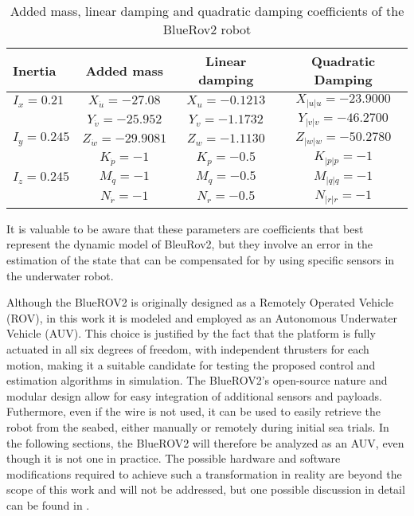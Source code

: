 \begin{table}[H]
    \centering
    \begin{tabular}{l c c c} \toprule
        {Inertia} & {Added mass} & {Linear damping} & {Quadratic Damping} \\ \midrule
        $I_x = 0.21$ & $X_{\dot{u}} = -27.08$ & $X_u = -0.1213$  & $X_{|u|u} = -23.9000$ \\
        { } & $Y_{\dot{v}} = -25.952$ & $Y_v = -1.1732$  & $Y_{|v|v} = -46.2700$ \\
        $I_y = 0.245$ & $Z_{\dot{w}} = -29.9081$ & $Z_w = -1.1130$  & $Z_{|w|w} = -50.2780$ \\
        { } & $K_{\dot{p}} = -1$ & $K_p = -0.5$  & $K_{|p|p} = -1$ \\
        $I_z = 0.245$ & $M_{\dot{q}} = -1$ & $M_q = -0.5$  & $M_{|q|q} = -1$ \\
        { } & $N_{\dot{r}} = -1$ & $N_r = -0.5$  & $N_{|r|r} = -1$ \\ \bottomrule
    \end{tabular}
    \caption{Added mass, linear damping and quadratic damping coefficients of the BlueRov2 robot}
    \label{tab:BlueRov_param}
\end{table}

It is valuable to be aware that these parameters are coefficients that best represent the dynamic model of BleuRov2, but they involve an error in the estimation of the 
state that can be compensated for by using specific sensors in the underwater robot.

Although the BlueROV2 is originally designed as a Remotely Operated Vehicle (ROV), in this work it is modeled and employed as an Autonomous Underwater Vehicle (AUV). 
This choice is justified by the fact that the platform is fully actuated in all six degrees of freedom, with independent thrusters for each motion, making it a 
suitable candidate for testing the proposed control and estimation algorithms in simulation. The BlueROV2's open-source nature and modular design allow 
for easy integration of additional sensors and payloads. Futhermore, even if the wire is not used, it can be used to easily retrieve the robot from the seabed, 
either manually or remotely during initial sea trials.
In the following sections, the BlueROV2 will therefore be analyzed as an AUV, even though it is not one in practice. The possible hardware and software modifications 
required to achieve such a transformation in reality are beyond the scope of this work and will not be addressed, but one possible discussion in 
detail can be found in \cite{willnersMarketreadyROVsLowcost2021}.



